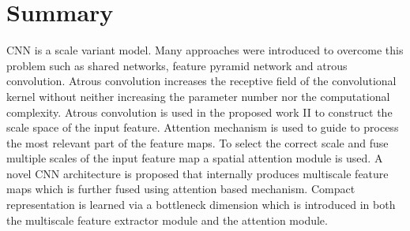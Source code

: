 \section{Summary}

CNN is a scale variant model. Many approaches were introduced to overcome this problem such as shared networks, feature pyramid network and atrous convolution. Atrous convolution increases the receptive field of the convolutional kernel without neither increasing the parameter number nor the computational complexity. Atrous convolution is used in the proposed work II to construct the scale space of the input feature. Attention mechanism is used to guide to process the most relevant part of the feature maps. To select the correct scale and fuse multiple scales of the input feature map a spatial attention module is used. A novel CNN architecture is proposed that internally produces multiscale feature maps which is further fused using attention based mechanism. Compact representation is learned via a bottleneck dimension which is introduced in both the multiscale feature extractor module and the attention module.

